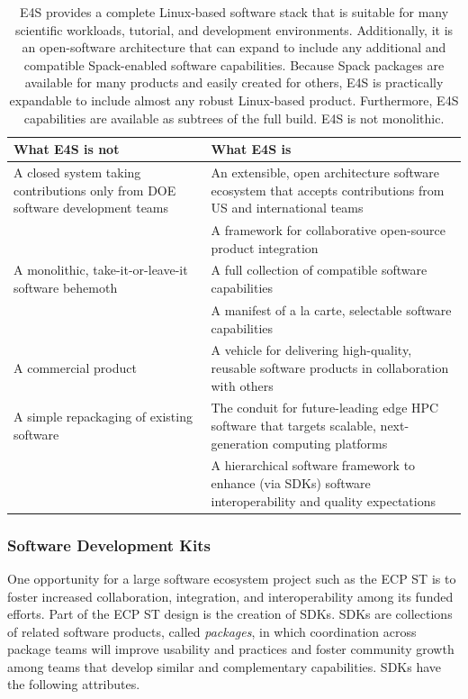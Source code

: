 \newpage
\begin{table}[h!]
\begin{tabularx}{\textwidth}{|X|X|}\hline
\rowcolor{LightCyan}
\textbf{What E4S is not}
& 
\textbf{What E4S is} \\\hline
A closed system taking contributions only from DOE software development teams 
&
An extensible, open architecture software ecosystem that accepts contributions from US and international teams \vspace{0.5em} \\%

& 
A framework for collaborative open-source product integration \\\hline
A monolithic, take-it-or-leave-it software behemoth
& 
A full collection of compatible software capabilities \vspace{0.5em} \\ %

& 
A manifest of a la carte, selectable software capabilities \\\hline
A commercial product
&
A vehicle for delivering high-quality, reusable software products in collaboration with others \\\hline
A simple repackaging of existing software
& 
The conduit for future-leading edge HPC software that targets scalable, next-generation computing platforms \vspace{0.5em} \\ %

& 
A hierarchical software framework to enhance (via SDKs) software interoperability and quality expectations  \\\hline

\end{tabularx}
\caption{E4S provides a complete Linux-based software stack that is suitable for many scientific workloads, tutorial, and development environments.  Additionally, it is an open-software architecture that can expand to include any additional and compatible Spack-enabled software capabilities. Because Spack packages are available for many products and easily created for others, E4S is practically expandable to include almost any robust Linux-based product.  Furthermore, E4S capabilities are available as subtrees of the full build. E4S is not monolithic.}
\label{table:e4s-is-isnot}
\end{table}
\newpage




\subsubsection{Software Development Kits}\label{subsubsect:sdks}
One opportunity for a large software ecosystem project such as the ECP ST is to foster increased collaboration, integration, and interoperability among its funded efforts. Part of the ECP ST design is the creation of SDKs.  SDKs are collections of related software products, called \textit{packages}, in which coordination across package teams will improve usability and practices and foster community growth among teams that develop similar and complementary capabilities. SDKs have the following attributes.

